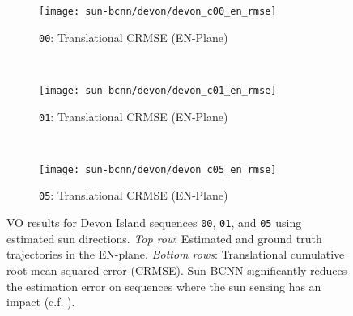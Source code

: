 \begin{figure}
    \begin{subfigure}{0.3\textwidth}
    	\texttt{[image: sun-bcnn/devon/devon\_c00\_en\_rmse]}
        \caption{\texttt{00}: Translational CRMSE (EN-Plane)}
        \label{fig:devon_c00_transerr_en}
    \end{subfigure}
    ~
    \begin{subfigure}{0.3\textwidth}
    	\texttt{[image: sun-bcnn/devon/devon\_c01\_en\_rmse]}
        \caption{\texttt{01}: Translational CRMSE (EN-Plane)}
        \label{fig:devon_c01_transerr_en}
    \end{subfigure}
    ~
    \begin{subfigure}{0.3\textwidth}
    	\texttt{[image: sun-bcnn/devon/devon\_c05\_en\_rmse]}
        \caption{\texttt{05}: Translational CRMSE (EN-Plane)}
        \label{fig:devon_c05_transerr_en}
    \end{subfigure}
    \caption{VO results for Devon Island sequences \texttt{00}, \texttt{01}, and \texttt{05} using estimated sun directions. \emph{Top row}: Estimated and ground truth trajectories in the EN-plane. \emph{Bottom rows}: Translational cumulative root mean squared error (CRMSE). Sun-BCNN significantly reduces the estimation error on sequences where the sun sensing has an impact (c.f. ).}
    \label{fig:sun-bcnn_devon_vo}
\end{figure}

